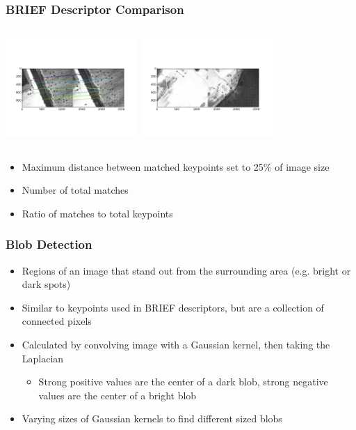 \documentclass{beamer}
\begin{document}
\begin{frame}
\frametitle{BRIEF Descriptor Comparison}
\begin{columns}
    \includegraphics[width = 5cm]{Figures/briefmatchgood}
    \includegraphics[width = 5cm]{Figures/briefmatchbad}
\end{columns}
  \begin{itemize}
    \item Maximum distance between matched keypoints set to 25\% of image size
    \item Number of total matches
    \item Ratio of matches to total keypoints
  \end{itemize}
\end{frame}


\begin{frame}
\frametitle{Blob Detection}
\begin{itemize}
  \item Regions of an image that stand out from the surrounding area (e.g. bright or dark spots)
  \item Similar to keypoints used in BRIEF descriptors, but are a collection of connected pixels
  \item Calculated by convolving image with a Gaussian kernel, then taking the Laplacian
  \begin{itemize}
    \item Strong positive values are the center of a dark blob, strong negative values are the center of a bright blob
  \end{itemize}
  \item Varying sizes of Gaussian kernels to find different sized blobs
\end{itemize}
\end{frame}
\end{document}
